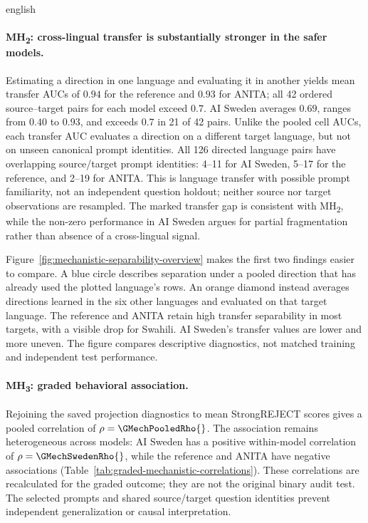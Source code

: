 \begin{otherlanguage*}{english}
\paragraph*{MH\textsubscript{2}: cross-lingual transfer is substantially stronger in the safer models.} Estimating a direction in one language and evaluating it in another yields mean transfer AUCs of $0.94$ for the reference and $0.93$ for ANITA; all 42 ordered source--target pairs for each model exceed $0.7$. AI Sweden averages $0.69$, ranges from $0.40$ to $0.93$, and exceeds $0.7$ in 21 of 42 pairs. Unlike the pooled cell AUCs, each transfer AUC evaluates a direction on a different target language, but not on unseen canonical prompt identities. All 126 directed language pairs have overlapping source/target prompt identities: 4--11 for AI Sweden, 5--17 for the reference, and 2--19 for ANITA. This is language transfer with possible prompt familiarity, not an independent question holdout; neither source nor target observations are resampled. The marked transfer gap is consistent with MH\textsubscript{2}, while the non-zero performance in AI Sweden argues for partial fragmentation rather than absence of a cross-lingual signal.

Figure~\ref{fig:mechanistic-separability-overview} makes the first two findings easier to compare. A blue circle describes separation under a pooled direction that has already used the plotted language's rows. An orange diamond instead averages directions learned in the six other languages and evaluated on that target language. The reference and ANITA retain high transfer separability in most targets, with a visible drop for Swahili. AI Sweden's transfer values are lower and more uneven. The figure compares descriptive diagnostics, not matched training and independent test performance.


\FloatBarrier

\paragraph*{MH\textsubscript{3}: graded behavioral association.} Rejoining the saved projection diagnostics to mean StrongREJECT scores gives a pooled correlation of $\rho=\GMechPooledRho{}$. The association remains heterogeneous across models: AI Sweden has a positive within-model correlation of $\rho=\GMechSwedenRho{}$, while the reference and ANITA have negative associations (Table~\ref{tab:graded-mechanistic-correlations}). These correlations are recalculated for the graded outcome; they are not the original binary audit test. The selected prompts and shared source/target question identities prevent independent generalization or causal interpretation.


\end{otherlanguage*}

